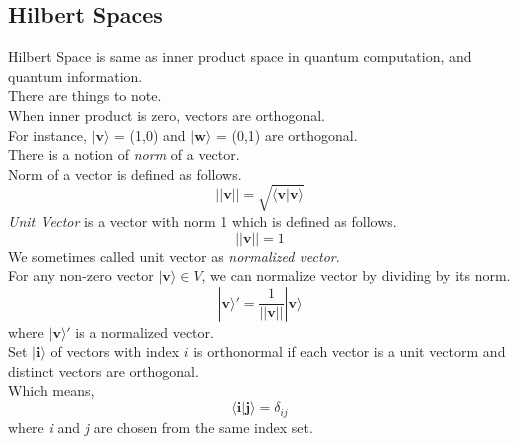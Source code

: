 \documentclass{article}
\begin{document}
\subsection{Hilbert Spaces}
Hilbert Space is same as inner product space in quantum computation, and quantum information. \\
There are things to note. \\
When inner product is zero, vectors are orthogonal. \\
For instance, $|\mathbf{v}\rangle$ = (1,0) and $|\mathbf{w}\rangle$ = (0,1) are orthogonal. \\
There is a notion of \textit{norm} of a vector. \\
Norm of a vector is defined as follows. \\
\begin{equation}
    ||\mathbf{v}|| = \sqrt{\langle\mathbf{v} | \mathbf{v}\rangle}
\end{equation}
\textit{Unit Vector} is a vector with norm 1 which is defined as follows. \\
\begin{equation}
    ||\mathbf{v}|| = 1
\end{equation}
We sometimes called unit vector as \textit{normalized vector}. \\
For any non-zero vector $|\mathbf{v}\rangle \in V$, we can normalize vector by dividing by its norm. \\
\begin{equation}
    |\mathbf{v}\rangle' = \frac{1}{||\mathbf{v}||} |\mathbf{v}\rangle
\end{equation}
where $|\mathbf{v}\rangle'$ is a normalized vector. \\

Set $|\mathbf{i}\rangle$ of vectors with index $i$ is orthonormal if each vector is a unit vectorm and distinct vectors are orthogonal. \\
Which means, 
\begin{equation}
    \langle\mathbf{i}|\mathbf{j}\rangle = \delta_{ij}
\end{equation} where \textit{i} and \textit{j} are chosen from the same index set. \\
\end{document}

